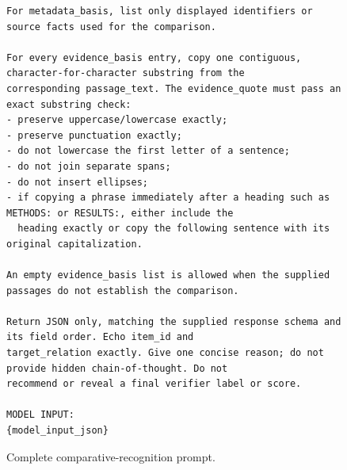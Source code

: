\documentclass[11pt]{article}
\begin{document}
\begin{figure}[p]
\begin{minipage}{0.96\textwidth}
\begin{lstlisting}[style=paperprompt]
For metadata_basis, list only displayed identifiers or source facts used for the comparison.

For every evidence_basis entry, copy one contiguous, character-for-character substring from the
corresponding passage_text. The evidence_quote must pass an exact substring check:
- preserve uppercase/lowercase exactly;
- preserve punctuation exactly;
- do not lowercase the first letter of a sentence;
- do not join separate spans;
- do not insert ellipses;
- if copying a phrase immediately after a heading such as METHODS: or RESULTS:, either include the
  heading exactly or copy the following sentence with its original capitalization.

An empty evidence_basis list is allowed when the supplied passages do not establish the comparison.

Return JSON only, matching the supplied response schema and its field order. Echo item_id and
target_relation exactly. Give one concise reason; do not provide hidden chain-of-thought. Do not
recommend or reveal a final verifier label or score.

MODEL INPUT:
{model_input_json}
\end{lstlisting}
\end{minipage}
\caption{Complete comparative-recognition prompt.}
\label{fig:recognition-prompt}
\end{figure}
\end{document}
